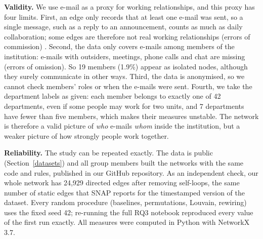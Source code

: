 

\textbf{Validity.} We use e-mail as a proxy for working relationships, and
this proxy has four limits. First, an edge only records that at least one
e-mail was sent, so a single message, such as a reply to an announcement,
counts as much as daily collaboration; some edges are therefore not real
working relationships (errors of commission) \cite{borgatti2018}. Second, the
data only covers e-mails among members of the institution: e-mails with
outsiders, meetings, phone calls and chat are missing (errors of omission).
So 19 members (1.9\%) appear as isolated nodes, although they surely
communicate in other ways. Third, the data is anonymised, so we cannot check
members' roles or when the e-mails were sent. Fourth, we take the department labels as
given: each member belongs to exactly one of 42 departments, even if some
people may work for two units, and 7 departments have fewer than five
members, which makes their measures unstable. The network is therefore a
valid picture of \emph{who} e-mails \emph{whom} inside the institution, but a
weaker picture of how strongly people work together.

\textbf{Reliability.} The study can be repeated exactly. The data is public
(Section~\ref{datasets}) and all group members built the networks with the
same code and rules, published in our GitHub repository. As an independent
check, our whole network has 24{,}929 directed edges after removing
self-loops, the same number of static edges that SNAP reports for the
timestamped version of the dataset. Every random procedure (baselines, permutations, Louvain,
rewiring) uses the fixed seed 42; re-running the full RQ3 notebook reproduced
every value of the first run exactly. All measures
were computed in Python with NetworkX 3.7.


